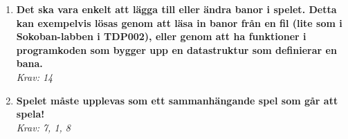 \documentclass[12pt]{TDP005mall}
\begin{document}
\begin{enumerate}
    
    \item \textbf{Det ska vara enkelt att lägga till eller ändra banor i spelet. Detta kan exempelvis lösas genom att läsa in banor från en fil (lite som i Sokoban-labben i TDP002), eller genom att ha funktioner i programkoden som bygger upp en datastruktur som definierar en bana.} \\ \emph{Krav: 14}
    
    \item \textbf{Spelet måste upplevas som ett sammanhängande spel som går att spela!} \\ \emph{Krav: 7, 1, 8}
\end{enumerate}
\end{document}
